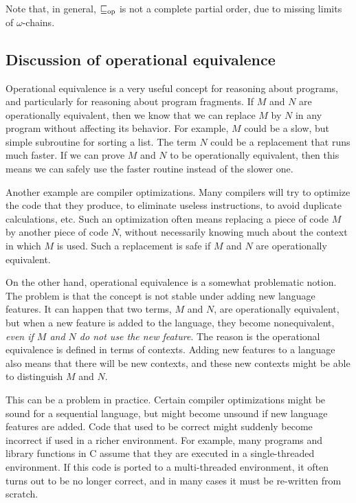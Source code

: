 \documentclass{article}
\begin{document}
Note that, in general, $\sqsubseteq_{\rm op}$ is not a complete partial order, due
to missing limits of $\omega$-chains.

\subsection{Discussion of operational equivalence}

Operational equivalence is a very useful concept for reasoning about
programs, and particularly for reasoning about program fragments. If
$M$ and $N$ are operationally equivalent, then we know that we can
replace $M$ by $N$ in any program without affecting its behavior.  For
example, $M$ could be a slow, but simple subroutine for sorting a
list. The term $N$ could be a replacement that runs much faster. If we can
prove $M$ and $N$ to be operationally equivalent, then this means we
can safely use the faster routine instead of the slower one. 

Another example are compiler optimizations. Many compilers will try to
optimize the code that they produce, to eliminate useless
instructions, to avoid duplicate calculations, etc. Such an
optimization often means replacing a piece of code $M$ by another
piece of code $N$, without necessarily knowing much about the context
in which $M$ is used. Such a replacement is safe if $M$ and $N$ are
operationally equivalent. 

On the other hand, operational equivalence is a somewhat problematic
notion. The problem is that the concept is not stable under adding new
language features. It can happen that two terms, $M$ and $N$, are
operationally equivalent, but when a new feature is added to the
language, they become nonequivalent, {\em even if $M$ and $N$ do not
  use the new feature}. The reason is the operational equivalence is
defined in terms of contexts. Adding new features to a language also
means that there will be new contexts, and these new contexts might be
able to distinguish $M$ and $N$. 

This can be a problem in practice. Certain compiler optimizations
might be sound for a sequential language, but might become unsound if
new language features are added. Code that used to be correct might
suddenly become incorrect if used in a richer environment. For
example, many programs and library functions in C assume that they are
executed in a single-threaded environment. If this code is ported to a
multi-threaded environment, it often turns out to be no longer
correct, and in many cases it must be re-written from scratch. 
\end{document}
